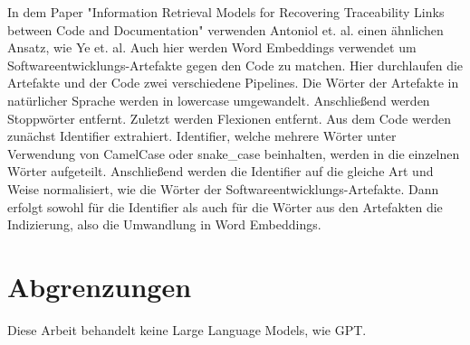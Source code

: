In dem Paper "Information Retrieval Models for Recovering Traceability Links between Code and Documentation" verwenden Antoniol et. al. einen ähnlichen Ansatz, wie Ye et. al.
Auch hier werden Word Embeddings verwendet um Softwareentwicklungs-Artefakte gegen den Code zu matchen.
Hier durchlaufen die Artefakte und der Code zwei verschiedene Pipelines.
Die Wörter der Artefakte in natürlicher Sprache werden in lowercase umgewandelt.
Anschließend werden Stoppwörter entfernt.
Zuletzt werden Flexionen entfernt.
Aus dem Code werden zunächst Identifier extrahiert.
Identifier, welche mehrere Wörter unter Verwendung von CamelCase oder snake\_case beinhalten, werden in die einzelnen Wörter aufgeteilt.
Anschließend werden die Identifier auf die gleiche Art und Weise normalisiert, wie die Wörter der Softwareentwicklungs-Artefakte.
Dann erfolgt sowohl für die Identifier als auch für die Wörter aus den Artefakten die Indizierung, also die Umwandlung in Word Embeddings.

\section{Abgrenzungen}
Diese Arbeit behandelt keine Large Language Models, wie GPT.